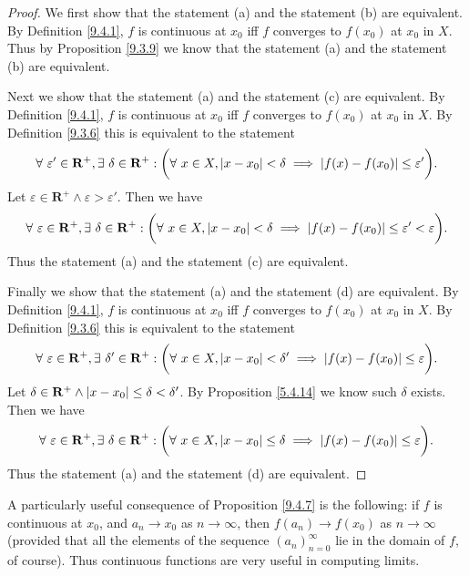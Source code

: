 \begin{proof}
    We first show that the statement (a) and the statement (b) are equivalent.
    By Definition \ref{9.4.1}, \(f\) is continuous at \(x_0\) iff \(f\) converges to \(f(x_0)\) at \(x_0\) in \(X\).
    Thus by Proposition \ref{9.3.9} we know that the statement (a) and the statement (b) are equivalent.

    Next we show that the statement (a) and the statement (c) are equivalent.
    By Definition \ref{9.4.1}, \(f\) is continuous at \(x_0\) iff \(f\) converges to \(f(x_0)\) at \(x_0\) in \(X\).
    By Definition \ref{9.3.6} this is equivalent to the statement
    \[
        \forall\ \varepsilon' \in \mathbf{R}^+, \exists\ \delta \in \mathbf{R}^+ : \bigg(\forall\ x \in X, \abs*{x - x_0} < \delta \implies \abs*{f(x) - f(x_0)} \leq \varepsilon'\bigg).
    \]
    Let \(\varepsilon \in \mathbf{R}^+ \land \varepsilon > \varepsilon'\).
    Then we have
    \[
        \forall\ \varepsilon \in \mathbf{R}^+, \exists\ \delta \in \mathbf{R}^+ : \bigg(\forall\ x \in X, \abs*{x - x_0} < \delta \implies \abs*{f(x) - f(x_0)} \leq \varepsilon' < \varepsilon\bigg).
    \]
    Thus the statement (a) and the statement (c) are equivalent.

    Finally we show that the statement (a) and the statement (d) are equivalent.
    By Definition \ref{9.4.1}, \(f\) is continuous at \(x_0\) iff \(f\) converges to \(f(x_0)\) at \(x_0\) in \(X\).
    By Definition \ref{9.3.6} this is equivalent to the statement
    \[
        \forall\ \varepsilon \in \mathbf{R}^+, \exists\ \delta' \in \mathbf{R}^+ : \bigg(\forall\ x \in X, \abs*{x - x_0} < \delta' \implies \abs*{f(x) - f(x_0)} \leq \varepsilon\bigg).
    \]
    Let \(\delta \in \mathbf{R}^+ \land \abs*{x - x_0} \leq \delta < \delta'\).
    By Proposition \ref{5.4.14} we know such \(\delta\) exists.
    Then we have
    \[
        \forall\ \varepsilon \in \mathbf{R}^+, \exists\ \delta \in \mathbf{R}^+ : \bigg(\forall\ x \in X, \abs*{x - x_0} \leq \delta \implies \abs*{f(x) - f(x_0)} \leq \varepsilon\bigg).
    \]
    Thus the statement (a) and the statement (d) are equivalent.
\end{proof}

\begin{remark}\label{9.4.8}
    A particularly useful consequence of Proposition \ref{9.4.7} is the following:
    if \(f\) is continuous at \(x_0\), and \(a_n \to x_0\) as \(n \to \infty\), then \(f(a_n) \to f(x_0)\) as \(n \to \infty\)
    (provided that all the elements of the sequence \((a_n)_{n = 0}^\infty\) lie in the domain of \(f\), of course).
    Thus continuous functions are very useful in computing limits.
\end{remark}

